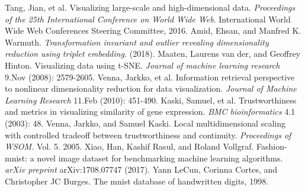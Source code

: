\documentclass[12pt]{article}
\begin{document}
\begin{thebibliography}{10}
	Tang, Jian, et al. Visualizing large-scale and high-dimensional data. \emph{Proceedings of the 25th International Conference on World Wide Web}. International World Wide Web Conferences Steering Committee, 2016.
	Amid, Ehsan, and Manfred K. Warmuth. \emph{Transformation invariant and outlier revealing dimensionality reduction using triplet embedding.} (2018).
	Maaten, Laurens van der, and Geoffrey Hinton. Visualizing data using t-SNE. \emph{Journal of machine learning research} 9.Nov (2008): 2579-2605.
	Venna, Jarkko, et al. Information retrieval perspective to nonlinear dimensionality reduction for data visualization. \emph{Journal of Machine Learning Research} 11.Feb (2010): 451-490.
	Kaski, Samuel, et al. Trustworthiness and metrics in visualizing similarity of gene expression. \emph{BMC bioinformatics} 4.1 (2003): 48.
	Venna, Jarkko, and Samuel Kaski. Local multidimensional scaling with controlled tradeoff between trustworthiness and continuity. \emph{Proceedings of WSOM.}  Vol. 5. 2005.
	Xiao, Han, Kashif Rasul, and Roland Vollgraf. Fashion-mnist: a novel image dataset for benchmarking machine learning algorithms. \emph{arXiv preprint} arXiv:1708.07747 (2017).
	Yann LeCun, Corinna Cortes, and Christopher JC Burges. The mnist database of handwritten digits, 1998.
\end{thebibliography}






\end{document}
